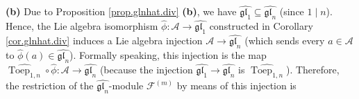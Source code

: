 \documentclass[etingof-lie.tex]{subfiles}
\begin{document}
\textbf{(b)} Due to Proposition \ref{prop.glnhat.div} \textbf{(b)}, we have
$\widehat{\mathfrak{gl}_{1}}\subseteq\widehat{\mathfrak{gl}_{n}}$ (since
$1\mid n$). Hence, the Lie algebra isomorphism $\widehat{\phi}:\mathcal{A}%
\rightarrow\widehat{\mathfrak{gl}_{1}}$ constructed in Corollary
\ref{cor.glnhat.div} induces a Lie algebra injection $\mathcal{A}%
\rightarrow\widehat{\mathfrak{gl}_{n}}$ (which sends every $a\in\mathcal{A}$
to $\widehat{\phi}\left(  a\right)  \in\widehat{\mathfrak{gl}_{n}}$). Formally
speaking, this injection is the map $\widehat{\operatorname*{Toep}%
\nolimits_{1,n}}\circ\widehat{\phi}:\mathcal{A}\rightarrow
\widehat{\mathfrak{gl}_{n}}$ (because the injection $\widehat{\mathfrak{gl}%
_{1}}\rightarrow\widehat{\mathfrak{gl}_{n}}$ is $\widehat{\operatorname*{Toep}%
\nolimits_{1,n}}$). Therefore, the restriction of the $\widehat{\mathfrak{gl}%
_{n}}$-module $\mathcal{F}^{\left(  m\right)  }$ by means of this injection is%
\end{document}
